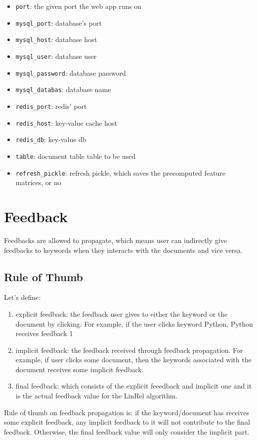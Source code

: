 \documentclass[10pt,a4paper]{article}
\begin{document}
\begin{itemize}
\item \verb+port+:  the given port  the web app runs on
\item \verb+mysql_port+:  database's port 
\item \verb+mysql_host+: database host
\item \verb+mysql_user+:  database user
\item \verb+mysql_password+:   database password
\item \verb+mysql_databas+:  database name
\item \verb+redis_port+:  redis' port 
\item \verb+redis_host+: key-value cache host
\item \verb+redis_db+: key-value db
\item \verb+table+:  document table table to be used 
\item \verb+refresh_pickle+: refresh pickle, which saves the precomputed feature matrices, or no
\end{itemize}

\section{Feedback}

Feedbacks are allowed to propagate, which means user can indirectly give feedbacks to keywords when they interacts with the documents and vice versa.

\subsection{ Rule of Thumb}

Let's define:
\begin{enumerate}
  \item explicit feedback: the feedback user gives to either the keyword or the document by clicking. For example, if the user clicks keyword Python, Python receives feedback 1
  \item implicit feedback: the feedback received through feedback propagation. For example, if user clicks some document, then the keywords associated with the document receives some implicit feedback.
  \item final feedback: which consists of the explicit feeedback and implicit one and it is the actual feedback value for the LinRel algorithm.
\end{enumerate}

Rule of thumb on feedback propagation is:
if the keyword/document has receives some explicit feedback, any implicit feedback to it will not contribute to the final feedback. 
Otherwise, the final feedback value will only consider the implicit part.
\end{document}
